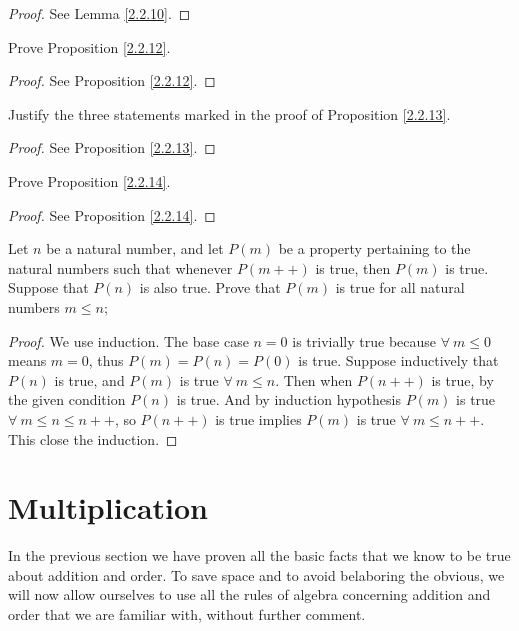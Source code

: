 \begin{proof}
See Lemma \ref{2.2.10}.
\end{proof}

\begin{exercise}\label{ex 2.2.3}
Prove Proposition \ref{2.2.12}.
\end{exercise}

\begin{proof}
See Proposition \ref{2.2.12}.
\end{proof}

\begin{exercise}\label{ex 2.2.4}
Justify the three statements marked in the proof of Proposition \ref{2.2.13}.
\end{exercise}

\begin{proof}
See Proposition \ref{2.2.13}.
\end{proof}

\begin{exercise}\label{ex 2.2.5}
Prove Proposition \ref{2.2.14}.
\end{exercise}

\begin{proof}
See Proposition \ref{2.2.14}.
\end{proof}

\begin{exercise}\label{ex 2.2.6}
Let \(n\) be a natural number, and let \(P(m)\) be a property pertaining to the natural numbers such that whenever \(P(m++)\) is true, then \(P(m)\) is true.
Suppose that \(P(n)\) is also true.
Prove that \(P(m)\) is true for all natural numbers \(m \leq n\);
\end{exercise}

\begin{proof}
We use induction.
The base case \(n = 0\) is trivially true because \(\forall\ m \leq 0\) means \(m = 0\), thus \(P(m) = P(n) = P(0)\) is true.
Suppose inductively that \(P(n)\) is true, and \(P(m)\) is true \(\forall\ m \leq n\).
Then when \(P(n++)\) is true, by the given condition \(P(n)\) is true.
And by induction hypothesis \(P(m)\) is true \(\forall\ m \leq n \leq n++\), so \(P(n++)\) is true implies \(P(m)\) is true \(\forall\ m \leq n++\).
This close the induction.
\end{proof}

\section{Multiplication}
\begin{note}
In the previous section we have proven all the basic facts that we know to be true about addition and order.
To save space and to avoid belaboring the obvious, we will now allow ourselves to use all the rules of algebra concerning addition and order that we are familiar with, without further comment.
\end{note}

